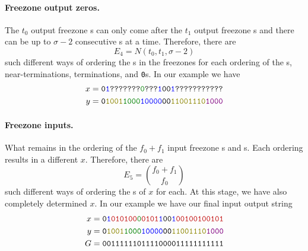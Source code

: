 \paragraph{Freezone output zeros.}
The $t_0$ output freezone {}s can only come after the $t_1$ output freezone {}s and there can be up to $\sigma-2$ consecutive s at a time. Therefore, there are
$$
E_4=N(t_0,t_1,\sigma-2)
$$ such different ways of ordering the \texttt{}s in the freezones for each ordering of the \texttt{}s, near-terminations, terminations, and \texttt{0}s. In our example we have
\begin{align*}
  x&=\texttt{0\blue{1}???????\green{0}???\blue{1}00\blue{1}???????????}\\
  y&=\texttt{0\olive{1001}\green{1000}\blue{10000}00\olive{11001110}\textcolor{violet}{1000}}
\end{align*}

\paragraph{Freezone inputs.}
What remains in the ordering of the $f_0+f_1$ input freezone \texttt{}s and \texttt{}s. Each ordering results in a different $x$. Therefore, there are
$$
E_5=\binom{f_0+f_1}{f_0}
$$
such different ways of ordering the \texttt{}s of $x$ for each. At this stage, we have also completely determined $x$. In our example we have our final input output string
\begin{align*}
  x&=\texttt{0\textcolor{blue}{1}\red{010100}\green{0}\red{0101}\textcolor{blue}{1}00\textcolor{blue}{1}\red{00100100101}}\\
  y&=\texttt{0\olive{1001}\green{1000}\blue{10000}00\olive{11001110}\textcolor{violet}{1000}}\\
  G&=\texttt{0011111101111000011111111111}
\end{align*}

